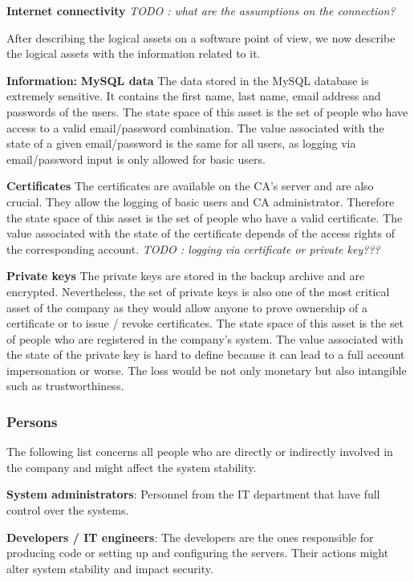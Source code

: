 \documentclass[english]{article}
\begin{document}
\textbf{Internet connectivity} \textit{TODO : what are the assumptions on the connection?}
\newline

After describing the logical assets on a software point of view, we now describe the logical assets with the information related to it.
\newline

\textbf{Information:}
\newline
\textbf{MySQL data} The data stored in the MySQL database is extremely sensitive. It contains the first name, last name, email address and passwords of the users. The state space of this asset is the set of people who have access to a valid email/password combination. The value associated with the state of a given email/password is the same for all users, as logging via email/password input is only allowed for basic users.

\textbf{Certificates} The certificates are available on the CA's server and are also crucial. They allow the logging of basic users and CA administrator. Therefore the state space of this asset is the set of people who have a valid certificate. The value associated with the state of the certificate depends of the access rights of the corresponding account. \textit{TODO : logging via certificate or private key???}

\textbf{Private keys} The private keys are stored in the backup archive and are encrypted. Nevertheless, the set of private keys is also one of the most critical asset of the company as they would allow anyone to prove ownership of a certificate or to issue / revoke certificates. The state space of this asset is the set of people who are registered in the company's system. The value associated with the state of the private key is hard to define because it can lead to a full account impersonation or worse. The loss would be not only monetary but also intangible such as trustworthiness.

\subsubsection{Persons}

The following list concerns all people who are directly or indirectly involved in the company and might affect the system stability.

\textbf{System administrators}: Personnel from the IT department that have full control over the systems.

\textbf{Developers / IT engineers}: The developers are the ones responsible for producing code or setting up and configuring the servers. Their actions might alter system stability and impact security.
\end{document}
